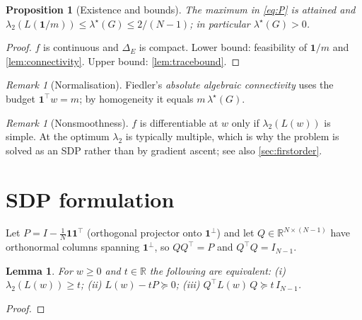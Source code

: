 \documentclass[11pt,a4paper]{article}
\newif\ifdraftnotes
\newcommand{\todo}[1]{\ifdraftnotes{\color{red!70!black}\sffamily[TODO: #1]}\fi}
\theoremstyle{plain}
\newtheorem{proposition}[theorem]{Proposition}
\newtheorem{lemma}[theorem]{Lemma}
\theoremstyle{definition}
\theoremstyle{remark}
\newtheorem{remark}[theorem]{Remark}
\newcommand{\R}{\mathbb{R}}
\newcommand{\one}{\mathbf{1}}
\newcommand{\simplex}{\Delta}
\newcommand{\opt}{\lambda^{\star}}        %
\begin{document}
	\begin{proposition}[Existence and bounds]\label{prop:exist}
		The maximum in \eqref{eq:P} is attained and
		$\lambda_2(L(\one/m))\le\opt(G)\le 2/(N-1)$; in particular $\opt(G)>0$.
	\end{proposition}
	\begin{proof}
		$f$ is continuous and $\simplex_E$ is compact. Lower bound: feasibility of
		$\one/m$ and \cref{lem:connectivity}. Upper bound: \cref{lem:tracebound}.
	\end{proof}
	
	\begin{remark}[Normalisation]
		Fiedler's \emph{absolute algebraic connectivity} \cite{Fiedler1990} uses
		the budget $\one^\top w=m$; by homogeneity it equals $m\,\opt(G)$.
	\end{remark}
	
	\begin{remark}[Nonsmoothness]\label{rem:nonsmooth}
		$f$ is differentiable at $w$ only if $\lambda_2(L(w))$ is simple. At the
		optimum $\lambda_2$ is typically multiple, which is why the problem is
		solved as an SDP rather than by gradient ascent; see also
		\cref{sec:firstorder}.
	\end{remark}
	
	\section{SDP formulation}\label{sec:sdp}
	
	Let $P=I-\frac1N\one\one^\top$ (orthogonal projector onto $\one^\perp$)
	and let $Q\in\R^{N\times(N-1)}$ have orthonormal columns spanning
	$\one^\perp$, so $QQ^\top=P$ and $Q^\top Q=I_{N-1}$.
	
	\begin{lemma}\label{lem:lmi}
		For $w\ge0$ and $t\in\R$ the following are equivalent:
		(i) $\lambda_2(L(w))\ge t$;\;
		(ii) $L(w)-tP\succeq0$;\;
		(iii) $Q^\top L(w)\,Q\succeq t\,I_{N-1}$.
	\end{lemma}
	\begin{proof}
		\todo{$L(w)$ and $P$ commute and share the eigenvector $\one$ (eigenvalue
			$0$ for both); on $\one^\perp$, $P$ acts as the identity.}
	\end{proof}
	
\end{document}
